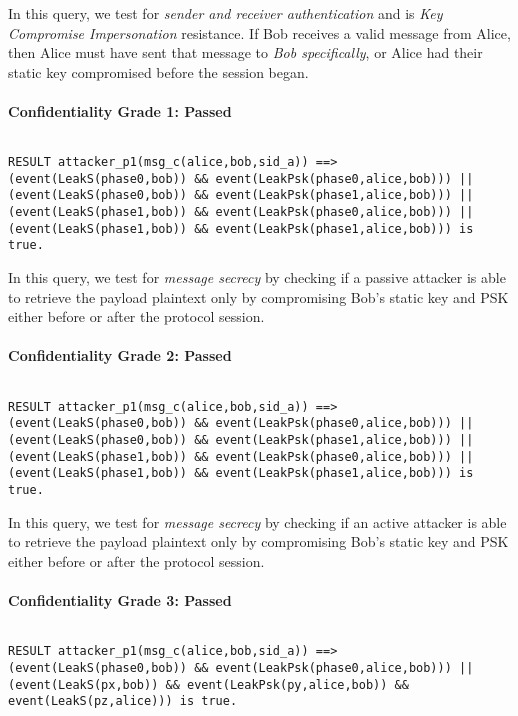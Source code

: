 In this query, we test for \emph{sender and receiver authentication} and is \emph{Key Compromise Impersonation} resistance. If Bob receives a valid message from Alice, then Alice must have sent that message to \emph{Bob specifically}, or Alice had their static key compromised before the session began.


\paragraph{Confidentiality Grade 1: Passed}$ $
\begin{lstlisting}
RESULT attacker_p1(msg_c(alice,bob,sid_a)) ==> (event(LeakS(phase0,bob)) && event(LeakPsk(phase0,alice,bob))) || (event(LeakS(phase0,bob)) && event(LeakPsk(phase1,alice,bob))) || (event(LeakS(phase1,bob)) && event(LeakPsk(phase0,alice,bob))) || (event(LeakS(phase1,bob)) && event(LeakPsk(phase1,alice,bob))) is true.
\end{lstlisting}

In this query, we test for \emph{message secrecy} by checking if a passive attacker is able to retrieve the payload plaintext only by compromising Bob's static key and PSK either before or after the protocol session.


\paragraph{Confidentiality Grade 2: Passed}$ $
\begin{lstlisting}
RESULT attacker_p1(msg_c(alice,bob,sid_a)) ==> (event(LeakS(phase0,bob)) && event(LeakPsk(phase0,alice,bob))) || (event(LeakS(phase0,bob)) && event(LeakPsk(phase1,alice,bob))) || (event(LeakS(phase1,bob)) && event(LeakPsk(phase0,alice,bob))) || (event(LeakS(phase1,bob)) && event(LeakPsk(phase1,alice,bob))) is true.
\end{lstlisting}

In this query, we test for \emph{message secrecy} by checking if an active attacker is able to retrieve the payload plaintext only by compromising Bob's static key and PSK either before or after the protocol session.


\paragraph{Confidentiality Grade 3: Passed}$ $
\begin{lstlisting}
RESULT attacker_p1(msg_c(alice,bob,sid_a)) ==> (event(LeakS(phase0,bob)) && event(LeakPsk(phase0,alice,bob))) || (event(LeakS(px,bob)) && event(LeakPsk(py,alice,bob)) && event(LeakS(pz,alice))) is true.
\end{lstlisting}

